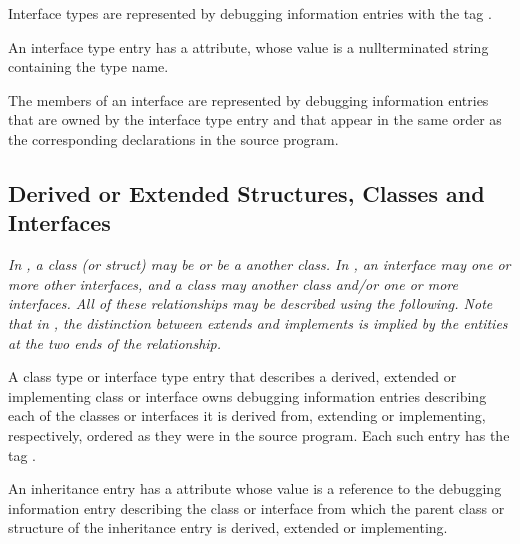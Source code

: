 Interface types
are represented by debugging information
entries with the
tag \DWTAGinterfacetypeTARG.

An interface type entry has
a \DWATname{} attribute,
whose value is a null\dash terminated string containing the
type name.

The members of an interface are represented by debugging
information entries that are owned by the interface type
entry and that appear in the same order as the corresponding
declarations in the source program.

\subsection{Derived or Extended Structures, Classes and Interfaces}
\label{chap:derivedorextendedstructsclasesandinterfaces}

\textit{In , a class (or struct)
may
be  or be a
 another class.
In , an interface may 
one
or more other interfaces, and a class may  another
class and/or  one or more interfaces. All of these
relationships may be described using the following. Note that
in ,
the distinction between extends and implements is
implied by the entities at the two ends of the relationship.}

A class type or interface type entry that describes a
derived, extended or implementing class or interface owns
debugging information entries describing each of the classes
or interfaces it is derived from, extending or implementing,
respectively, ordered as they were in the source program. Each
such entry has
the
tag \DWTAGinheritanceTARG.

An inheritance entry
has
a
\DWATtype{} attribute whose value is
a reference to the debugging information entry describing the
class or interface from which the parent class or structure
of the inheritance entry is derived, extended or implementing.

